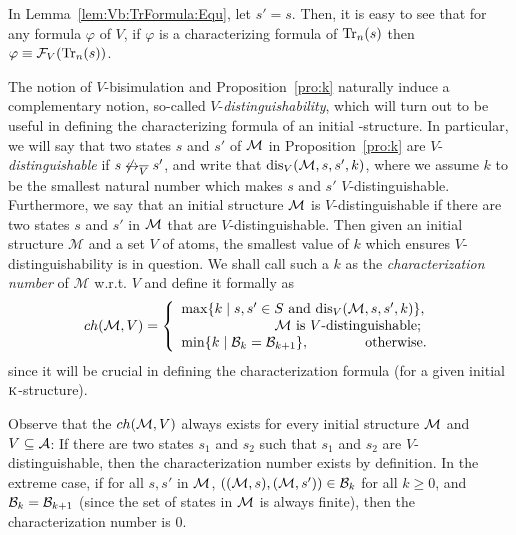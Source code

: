 \documentclass{article}
\begin{document}
In Lemma~\ref{lem:Vb:TrFormula:Equ}, let $s'=s$. Then, it is easy to see that for any formula $\varphi$ of $V$, if $\varphi$ is a characterizing formula of $\textrm{Tr}_n(s)$ then $\varphi \equiv {\cal F}_V(\textrm{Tr}_n(s))$.


The notion of $V$-bisimulation and Proposition~\ref{pro:k} naturally induce a complementary notion, so-called $V$-\emph{distinguishability}, which will turn out to be useful in defining the characterizing formula of an initial \MPK-structure.
In particular, we will say that two states $s$ and $s'$ of ${\cal M}$ in Proposition~\ref{pro:k} are $V$-{\em distinguishable} if $s \not \leftrightarrow_{\overline V} s'$, and write that $\textrm{dis}_V({\cal M},s,s',k)$, where we assume $k$ to be the  smallest natural number which makes $s$ and $s'$ $V$-distinguishable. Furthermore, we say that an initial  structure ${\cal M}$ is $V$-distinguishable if there are two states $s$ and $s'$ in ${\cal M}$ that are $V$-distinguishable. Then given an initial structure $\mathcal{M}$ and a set $V$ of atoms, the smallest value of $k$ which ensures $V$-distinguishability  is in question. We shall call such a $k$ as the \emph{characterization number} of $\mathcal{M}$ w.r.t. $V$ and define it formally as
\[ch({\cal M},V)=
\left\{
  \begin{array}{ll}
    \max\{k\mid s,s'\in S \text{ and }\textrm{dis}_V({\cal M},s,s',k)\},\\
         \ \ \qquad \qquad \qquad \hbox{${\cal M}$ is $V$-distinguishable;} \\
    \min\{k\mid {\cal B}_{k}={\cal B}_{k+1}\}, \ \ \ \quad \qquad \hbox{otherwise.}
  \end{array}
\right.
\]
 since it will be crucial in defining the characterization formula (for a given initial $\textsc{k}$-structure).

Observe that the $ch({\cal M}, V)$ always exists for every initial  structure ${\cal M}$ and $V\subseteq {\cal A}$: If there are two states $s_1$ and $s_2$ such that $s_1$ and $s_2$ are $V$-distinguishable, then the characterization number exists by definition. In the extreme case, if for all $s, s'$ in ${\cal M}$, $(({\cal M},s), ({\cal M}, s')) \in {\cal B}_k$ for all $k \geq 0$, and  ${\cal B}_k = {\cal B}_{k+1}$ (since the set of states in ${\cal M}$ is always finite), then the characterization number is 0.
\end{document}
